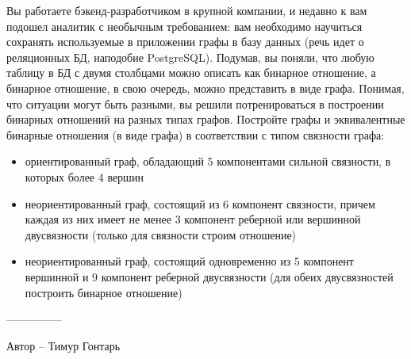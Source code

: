 \question
Вы работаете бэкенд-разработчиком в крупной компании, и недавно к вам подошел аналитик с необычным требованием: вам необходимо научиться сохранять используемые в приложении графы в базу данных (речь идет о реляционных БД, наподобие PostgreSQL). Подумав, вы поняли, что любую таблицу в БД с двумя столбцами можно описать как бинарное отношение, а бинарное отношение, в свою очередь, можно представить в виде графа. Понимая, что ситуации могут быть разными, вы решили потренироваться в построении бинарных отношений на разных типах графов. Постройте графы и эквивалентные бинарные отношения (в виде графа) в соответствии с типом связности графа:

\begin{itemize}
\item ориентированный граф, обладающий 5 компонентами сильной связности, в которых более 4 вершин
\item неориентированный граф, состоящий из 6 компонент связности, причем каждая из них имеет не менее 3 компонент реберной или вершинной двусвязности (только для связности строим отношение)
\item неориентированный граф, состоящий одновременно из 5 компонент вершинной и 9 компонент реберной двусвязности (для обеих двусвязностей построить бинарное отношение)
\end{itemize}

---------------

Автор -- Тимур Гонтарь